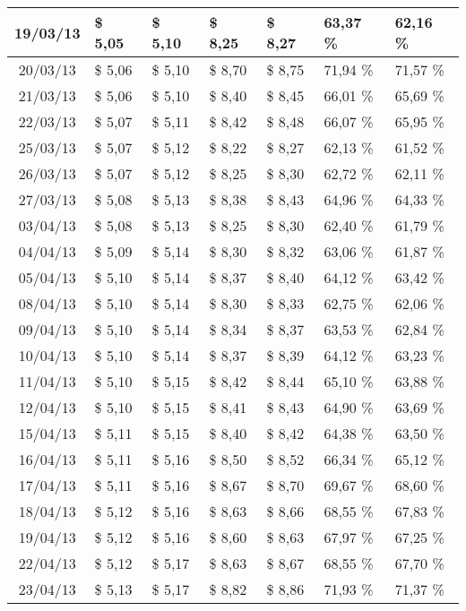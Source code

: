 \begin{center}
\begin{longtable}{|c|p{1.5cm}|p{1.5cm}|p{1.5cm}|p{1.5cm}|p{1.5cm}|p{1.5cm}|}
19/03/13 & \$ 5,05 & \$ 5,10 & \$ 8,25 & \$ 8,27 & 63,37 \% & 62,16 \% \\ \hline
20/03/13 & \$ 5,06 & \$ 5,10 & \$ 8,70 & \$ 8,75 & 71,94 \% & 71,57 \% \\ \hline
21/03/13 & \$ 5,06 & \$ 5,10 & \$ 8,40 & \$ 8,45 & 66,01 \% & 65,69 \% \\ \hline
22/03/13 & \$ 5,07 & \$ 5,11 & \$ 8,42 & \$ 8,48 & 66,07 \% & 65,95 \% \\ \hline
25/03/13 & \$ 5,07 & \$ 5,12 & \$ 8,22 & \$ 8,27 & 62,13 \% & 61,52 \% \\ \hline
26/03/13 & \$ 5,07 & \$ 5,12 & \$ 8,25 & \$ 8,30 & 62,72 \% & 62,11 \% \\ \hline
27/03/13 & \$ 5,08 & \$ 5,13 & \$ 8,38 & \$ 8,43 & 64,96 \% & 64,33 \% \\ \hline
03/04/13 & \$ 5,08 & \$ 5,13 & \$ 8,25 & \$ 8,30 & 62,40 \% & 61,79 \% \\ \hline
04/04/13 & \$ 5,09 & \$ 5,14 & \$ 8,30 & \$ 8,32 & 63,06 \% & 61,87 \% \\ \hline
05/04/13 & \$ 5,10 & \$ 5,14 & \$ 8,37 & \$ 8,40 & 64,12 \% & 63,42 \% \\ \hline
08/04/13 & \$ 5,10 & \$ 5,14 & \$ 8,30 & \$ 8,33 & 62,75 \% & 62,06 \% \\ \hline
09/04/13 & \$ 5,10 & \$ 5,14 & \$ 8,34 & \$ 8,37 & 63,53 \% & 62,84 \% \\ \hline
10/04/13 & \$ 5,10 & \$ 5,14 & \$ 8,37 & \$ 8,39 & 64,12 \% & 63,23 \% \\ \hline
11/04/13 & \$ 5,10 & \$ 5,15 & \$ 8,42 & \$ 8,44 & 65,10 \% & 63,88 \% \\ \hline
12/04/13 & \$ 5,10 & \$ 5,15 & \$ 8,41 & \$ 8,43 & 64,90 \% & 63,69 \% \\ \hline
15/04/13 & \$ 5,11 & \$ 5,15 & \$ 8,40 & \$ 8,42 & 64,38 \% & 63,50 \% \\ \hline
16/04/13 & \$ 5,11 & \$ 5,16 & \$ 8,50 & \$ 8,52 & 66,34 \% & 65,12 \% \\ \hline
17/04/13 & \$ 5,11 & \$ 5,16 & \$ 8,67 & \$ 8,70 & 69,67 \% & 68,60 \% \\ \hline
18/04/13 & \$ 5,12 & \$ 5,16 & \$ 8,63 & \$ 8,66 & 68,55 \% & 67,83 \% \\ \hline
19/04/13 & \$ 5,12 & \$ 5,16 & \$ 8,60 & \$ 8,63 & 67,97 \% & 67,25 \% \\ \hline
22/04/13 & \$ 5,12 & \$ 5,17 & \$ 8,63 & \$ 8,67 & 68,55 \% & 67,70 \% \\ \hline
23/04/13 & \$ 5,13 & \$ 5,17 & \$ 8,82 & \$ 8,86 & 71,93 \% & 71,37 \% \\ \hline

\end{longtable}
\end{center}
